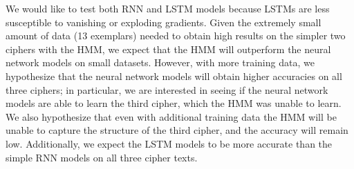 \documentclass{article}
\begin{document}
We would like to test both RNN and LSTM models because LSTMs are less susceptible to vanishing or exploding gradients. Given the extremely small amount of data (13 exemplars) needed to obtain high results on the simpler two ciphers with the HMM, we expect that the HMM will outperform the neural network models on small datasets. However, with more training data, we hypothesize that the neural network models will obtain higher accuracies on all three ciphers; in particular, we are interested in seeing if the neural network models are able to learn the third cipher, which the HMM was unable to learn. We also hypothesize that even with additional training data the HMM will be unable to capture the structure of the third cipher, and the accuracy will remain low. Additionally, we expect the LSTM models to be more accurate than the simple RNN models on all three cipher texts.  
\end{document}
